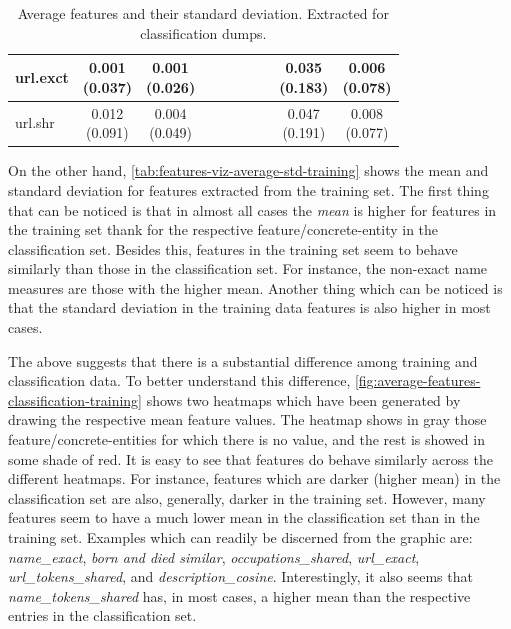 \documentclass[epsfig,a4paper,11pt,titlepage,twoside,openany]{book}
\begin{document}
\begin{table}[h]
\begin{tabular}{l|c|c|c|c|c|c|c|c|c|}
\multicolumn{1}{|l|}{url.exct}                           & \makecell{0.001 \\ (0.037)}  & \makecell{0.001 \\ (0.026)} &              &              &              &              &              & \makecell{0.035 \\ (0.183)}    & \makecell{0.006 \\ (0.078)}   \\ \hline
\multicolumn{1}{|l|}{url.shr}                  & \makecell{0.012 \\ (0.091)}  & \makecell{0.004 \\ (0.049)} &              &              &              &              &              & \makecell{0.047 \\ (0.191)}    & \makecell{0.008 \\ (0.077)}   \\ \hline
\end{tabular}
\caption{Average features and their standard deviation. Extracted for classification dumps.}
\label{tab:features-viz-average-std-classification}
\end{table}


On the other hand, \autoref{tab:features-viz-average-std-training} shows the mean and standard deviation for features extracted from the training set. The first thing that can be noticed is that in almost all cases the \textit{mean} is higher for features in the training set thank for the respective feature/concrete-entity in the classification set. Besides this, features in the training set seem to behave similarly than those in the classification set. For instance, the non-exact name measures are those with the higher mean. Another thing which can be noticed is that the standard deviation in the training data features is also higher in most cases. 

The above suggests that there is a substantial difference among training and classification data. To better understand this difference, \autoref{fig:average-features-classification-training} shows two heatmaps which have been generated by drawing the respective mean feature values. The heatmap shows in gray those feature/concrete-entities for which there is no value, and the rest is showed in some shade of red. It is easy to see that features do behave similarly across the different heatmaps. For instance, features which are darker (higher mean) in the classification set are also, generally, darker in the training set. However, many features seem to have a much lower mean in the classification set than in the training set. Examples which can readily be discerned from the graphic are: \textit{name\_exact}, \textit{born and died similar}, \textit{occupations\_shared}, \textit{url\_exact}, \textit{url\_tokens\_shared}, and \textit{description\_cosine}. Interestingly, it also seems that \textit{name\_tokens\_shared} has, in most cases, a higher mean than the respective entries in the classification set.
\end{document}
